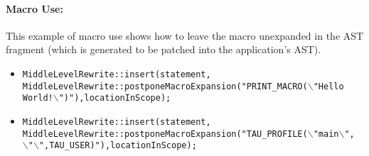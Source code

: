 \paragraph{Macro Use:}
   This example of macro use shows how to leave the macro unexpanded in the
AST fragment (which is generated to be patched into the application's AST).
\begin{itemize}
   \item {\tt MiddleLevelRewrite::insert(statement, \\
                 MiddleLevelRewrite::postponeMacroExpansion("PRINT\_MACRO($\backslash$"Hello World!$\backslash$")"),locationInScope);} \\
   \item {\tt MiddleLevelRewrite::insert(statement, \\
                 MiddleLevelRewrite::postponeMacroExpansion("TAU\_PROFILE($\backslash$"main$\backslash$", \\
                 $\backslash$"$\backslash$",TAU\_USER)"),locationInScope);}
\end{itemize}


